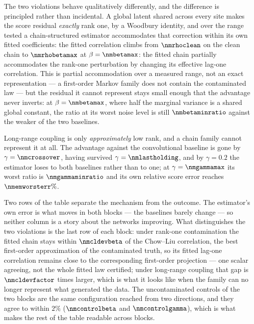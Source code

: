 \noindent The two violations behave qualitatively differently, and the
difference is principled rather than incidental. A global latent shared across
every site makes the score residual \emph{exactly} rank one, by a Woodbury
identity, and over the range tested a chain-structured estimator accommodates
that correction within its own fitted coefficients: the fitted correlation
climbs from $\nmrhoclean$ on the clean chain to $\nmrhobetamax$ at
$\beta = \nmbetamax$: the fitted chain partially accommodates the rank-one
perturbation by changing its effective lag-one correlation. This is partial
accommodation over a measured range, not an exact representation --- a first-order Markov family does not contain the contaminated
law --- but the residual it cannot represent stays small enough that the
advantage never inverts: at $\beta = \nmbetamax$, where half the marginal
variance is a shared global constant, the ratio at its worst noise level is
still $\nmbetaminratio$ against the weaker of the two baselines.

Long-range coupling is only \emph{approximately} low rank, and a chain family
cannot represent it at all. The advantage against the convolutional baseline is
gone by $\gamma = \nmcrossover$, having survived $\gamma = \nmlastholding$, and
by $\gamma = 0.2$ the estimator loses to both baselines rather than to one; at
$\gamma = \nmgammamax$ its worst ratio is $\nmgammaminratio$ and its own
relative score error reaches $\nmemworsterr\%$.

Two rows of the table separate the mechanism from the outcome. The estimator's
own error is what moves in both blocks --- the baselines barely change --- so
neither column is a story about the networks improving. What distinguishes the
two violations is the last row of each block: under rank-one contamination the
fitted chain stays within $\nmcldevbeta$ of the Chow--Liu correlation, the best
first-order approximation of the contaminated truth, so its fitted lag-one
correlation remains close to the corresponding first-order projection --- one
scalar agreeing, not the whole fitted law certified; under long-range coupling
that gap is $\nmcldevfactor$ times
larger, which is what it looks like when the family can no longer represent
what generated the data. The uncontaminated controls of the two blocks are the
same configuration reached from two directions, and they agree to within $2\%$
($\nmcontrolbeta$ and $\nmcontrolgamma$), which is what makes the rest of the
table readable across blocks.

